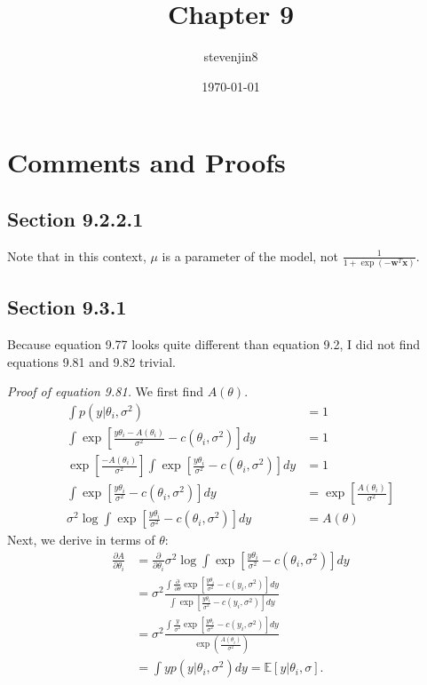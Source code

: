 \documentclass[a4paper,11pt]{article}
\title{Chapter 9}
\author{stevenjin8}
\date{\today}
\begin{document}
\maketitle

\section*{Comments and Proofs}
\subsection*{Section 9.2.2.1}
Note that in this context, $\mu$ is a parameter of the model,
not $\frac{1}{1+\exp(-\mathbf{w}^T\mathbf{x})}$.

\subsection*{Section 9.3.1}
Because equation 9.77 looks quite different than equation 9.2, I did not find
equations 9.81 and 9.82 trivial.

\textit{Proof of equation 9.81.} We first find $A(\theta)$.
\begin{align*}
    \int p(y|\theta_i, \sigma^2) &= 1 \\
    \int \exp\left[
        \frac{
            y\theta_i - A(\theta_i)
        }{
            \sigma^2
        }
        - c(\theta_i, \sigma^2)
    \right]dy &= 1 \\
    \exp\left[\frac{-A(\theta_i)}{\sigma^2}\right]
    \int \exp\left[
        \frac{y\theta_i}{\sigma^2}-c(\theta_i, \sigma^2)
    \right]dy
    &= 1 \\
    \int \exp\left[
        \frac{y\theta_i}{\sigma^2}-c(\theta_i, \sigma^2)
    \right]dy
    &= \exp\left[\frac{A(\theta_i)}{\sigma^2}\right] \\
    \sigma^2\log\int \exp\left[
        \frac{y\theta_i}{\sigma^2}-c(\theta_i, \sigma^2)
    \right]dy &= A(\theta)
\end{align*}
Next, we derive in terms of $\theta$:
\begin{align*}
    \frac{\partial A}{\partial \theta_i}
    &= \frac{\partial}{\partial \theta_i}
    \sigma^2\log\int \exp\left[
        \frac{y\theta_i}{\sigma^2}-c(\theta_i, \sigma^2)
    \right]dy \\
    &= \sigma^2 \frac{
        \int \frac{\partial}{\partial\theta}\exp\left[
            \frac{y\theta_i}{\sigma^2}-c(y_i, \sigma^2)
        \right]dy
    }{
        \int \exp\left[
            \frac{y\theta_i}{\sigma^2}-c(y_i, \sigma^2)
        \right]dy
    } \\
    &= \sigma^2 \frac{
        \int \frac{y}{\sigma^2} \exp\left[
            \frac{y\theta_i}{\sigma^2}-c(y_i, \sigma^2)
        \right]dy
    }{
        \exp(\frac{A(\theta_i)}{\sigma^2})
    } \\
    &= \int y p(y|\theta_i, \sigma^2) dy = \mathbb{E}[y|\theta_i, \sigma].
\end{align*}
\end{document}
